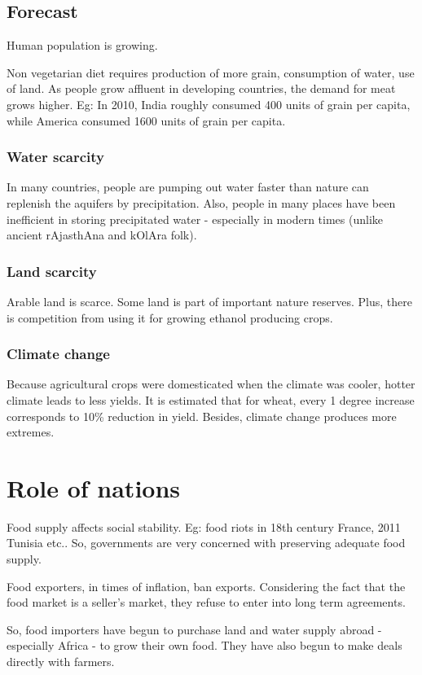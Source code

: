 \documentclass[oneside, article]{memoir}
\begin{document}
\subsection{Forecast}
Human population is growing.

Non vegetarian diet requires production of more grain, consumption of water, use of land. As people grow affluent in developing countries, the demand for meat grows higher. Eg: In 2010, India roughly consumed 400 units of grain per capita, while America consumed 1600 units of grain per capita.

\subsubsection{Water scarcity}
In many countries, people are pumping out water faster than nature can replenish the aquifers by precipitation. Also, people in many places have been inefficient in storing precipitated water - especially in modern times (unlike ancient rAjasthAna and kOlAra folk).

\subsubsection{Land scarcity}
Arable land is scarce. Some land is part of important nature reserves. Plus, there is competition from using it for growing ethanol producing crops.

\subsubsection{Climate change}
Because agricultural crops were domesticated when the climate was cooler, hotter climate leads to less yields. It is estimated that for wheat, every 1 degree increase corresponds to 10\% reduction in yield. Besides, climate change produces more extremes.

\section{Role of nations}
Food supply affects social stability. Eg: food riots in 18th century France, 2011 Tunisia etc.. So, governments are very concerned with preserving adequate food supply.

Food exporters, in times of inflation, ban exports. Considering the fact that the food market is a seller's market, they refuse to enter into long term agreements.

So, food importers have begun to purchase land and water supply abroad - especially Africa - to grow their own food. They have also begun to make deals directly with farmers.
\end{document}
